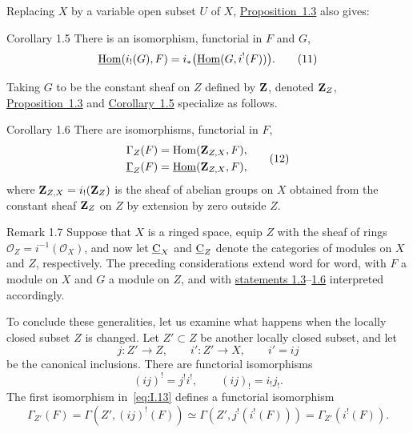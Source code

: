 Replacing $X$ by a variable open subset $U$ of $X$, \hyperref[I.1.3]{Proposition~1.3}
also gives:

\begin{sgastatement}{Corollary 1.5}
There is an isomorphism, functorial in $F$ and $G$,
\begin{equation}
  \mathop{\underline{\mathrm{Hom}}}\nolimits(i_!(G),F)=i_*\bigl(\mathop{\underline{\mathrm{Hom}}}\nolimits(G,i^!(F))\bigr).
  \tag{11}\label{eq:I.11}
\end{equation}
\end{sgastatement}

Taking $G$ to be the constant sheaf on $Z$ defined by $\mathbf Z$, denoted
$\mathbf Z_Z$, \hyperref[I.1.3]{Proposition~1.3} and \hyperref[I.1.5]{Corollary~1.5} specialize as follows.

\begin{sgastatement}{Corollary 1.6}
There are isomorphisms, functorial in $F$,
\begin{equation}
  \begin{aligned}
    \Gamma_Z(F)&=\operatorname{Hom}(\mathbf Z_{Z,X},F),\\
    \mathop{\underline{\Gamma}}\nolimits_Z(F)&=\mathop{\underline{\mathrm{Hom}}}\nolimits(\mathbf Z_{Z,X},F),
  \end{aligned}
  \tag{12}\label{eq:I.12}
\end{equation}
where $\mathbf Z_{Z,X}=i_!(\mathbf Z_Z)$ is the sheaf of abelian groups on $X$
obtained from the constant sheaf $\mathbf Z_Z$ on $Z$ by extension by zero
outside $Z$.
\end{sgastatement}

\begin{sgaremark}{Remark 1.7}
Suppose that $X$ is a ringed space, equip $Z$ with the sheaf of rings
$\mathcal O_Z=i^{-1}(\mathcal O_X)$, and now let $\underline{\mathrm C}_X$ and $\underline{\mathrm C}_Z$
denote the categories of modules on $X$ and $Z$, respectively.  The
preceding considerations extend word for word, with $F$ a module on $X$
and $G$ a module on $Z$, and with \hyperref[I.1.3]{statements 1.3}--\hyperref[I.1.6]{1.6} interpreted
accordingly.
\end{sgaremark}

To conclude these generalities, let us examine what happens when the
locally closed subset $Z$ is changed.  Let $Z'\subset Z$ be another
locally closed subset, and let
\[
  j:Z'\longrightarrow Z,
  \qquad i':Z'\longrightarrow X,
  \qquad i'=ij
\]
be the canonical inclusions.  There are functorial
isomorphisms
\begin{equation}
  (ij)^!=j^!i^!,
  \qquad
  (ij)_!=i_!j_!.
  \tag{13}\label{eq:I.13}
\end{equation}
The first isomorphism in~\eqref{eq:I.13} defines a functorial
isomorphism
\begin{equation}
  \Gamma_{Z'}(F)
  =\Gamma(Z',(ij)^!(F))
  \simeq\Gamma(Z',j^!(i^!(F)))
  =\Gamma_{Z'}(i^!(F)).
  \tag{14}\label{eq:I.14}
\end{equation}

